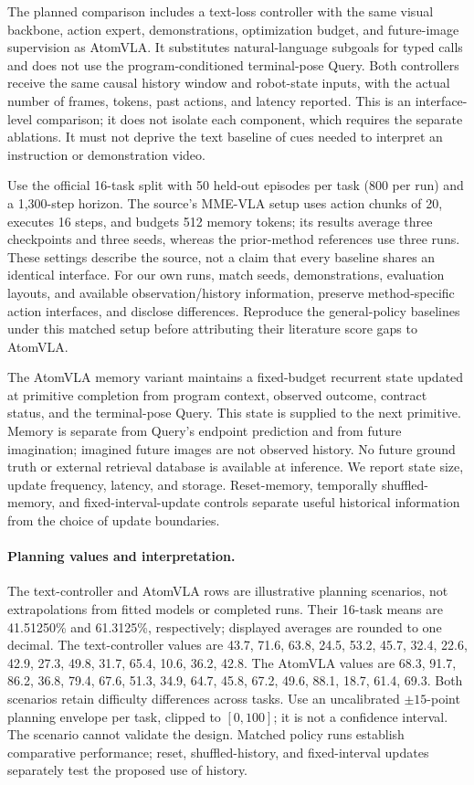 The planned comparison includes a text-loss controller with the same visual backbone, action expert, demonstrations, optimization budget, and future-image supervision as AtomVLA. It substitutes natural-language subgoals for typed calls and does not use the program-conditioned terminal-pose Query. Both controllers receive the same causal history window and robot-state inputs, with the actual number of frames, tokens, past actions, and latency reported. This is an interface-level comparison; it does not isolate each component, which requires the separate ablations. It must not deprive the text baseline of cues needed to interpret an instruction or demonstration video.

Use the official 16-task split with 50 held-out episodes per task (800 per run) and a 1,300-step horizon. The source's MME-VLA setup uses action chunks of 20, executes 16 steps, and budgets 512 memory tokens; its results average three checkpoints and three seeds, whereas the prior-method references use three runs. These settings describe the source, not a claim that every baseline shares an identical interface. For our own runs, match seeds, demonstrations, evaluation layouts, and available observation/history information, preserve method-specific action interfaces, and disclose differences. Reproduce the general-policy baselines under this matched setup before attributing their literature score gaps to AtomVLA.

The AtomVLA memory variant maintains a fixed-budget recurrent state updated at primitive completion from program context, observed outcome, contract status, and the terminal-pose Query. This state is supplied to the next primitive. Memory is separate from Query's endpoint prediction and from future imagination; imagined future images are not observed history. No future ground truth or external retrieval database is available at inference. We report state size, update frequency, latency, and storage. Reset-memory, temporally shuffled-memory, and fixed-interval-update controls separate useful historical information from the choice of update boundaries.

\paragraph{Planning values and interpretation.}
The text-controller and AtomVLA rows are illustrative planning scenarios, not extrapolations from fitted models or completed runs. Their 16-task means are 41.51250\% and 61.3125\%, respectively; displayed averages are rounded to one decimal. The text-controller values are 43.7, 71.6, 63.8, 24.5, 53.2, 45.7, 32.4, 22.6, 42.9, 27.3, 49.8, 31.7, 65.4, 10.6, 36.2, 42.8. The AtomVLA values are 68.3, 91.7, 86.2, 36.8, 79.4, 67.6, 51.3, 34.9, 64.7, 45.8, 67.2, 49.6, 88.1, 18.7, 61.4, 69.3. Both scenarios retain difficulty differences across tasks. Use an uncalibrated $\pm15$-point planning envelope per task, clipped to $[0,100]$; it is not a confidence interval. The scenario cannot validate the design. Matched policy runs establish comparative performance; reset, shuffled-history, and fixed-interval updates separately test the proposed use of history.

